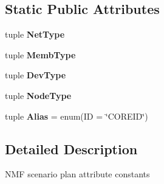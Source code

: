 \subsection*{Static Public Attributes}
\begin{DoxyCompactItemize}
\item 
tuple {\bfseries Net\+Type}
\item 
tuple {\bfseries Memb\+Type}
\item 
tuple {\bfseries Dev\+Type}
\item 
tuple {\bfseries Node\+Type}
\item 
\hypertarget{classcore_1_1misc_1_1xmlwriter1_1_1_attrib_a8796c33eb30cc243e726a66af21f2d77}{tuple {\bfseries Alias} = enum(I\+D = \char`\"{}C\+O\+R\+E\+I\+D\char`\"{})}\label{classcore_1_1misc_1_1xmlwriter1_1_1_attrib_a8796c33eb30cc243e726a66af21f2d77}

\end{DoxyCompactItemize}


\subsection{Detailed Description}
\begin{DoxyVerb}NMF scenario plan attribute constants
\end{DoxyVerb}
 

